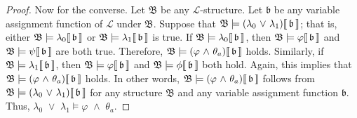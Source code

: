 \begin{proof}
    \vspace{0.3cm}
    \noindent
    Now for the converse.
    Let \( \mathfrak{B} \) be any \( \mathcal{L} \)-structure. Let \( \mathfrak{b} \) be any variable assignment function of \( \mathcal{L} \)
    under \( \mathfrak{B} \).
    Suppose that \( \folwffsatisfaction{\mathfrak{B}}{\mleft( \lambda_{0} \,\,{\lor}\,\, \lambda_{1} \mright)}{\mathfrak{b}} \);
    that is, either \(  \mathfrak{B} \models \lambda_{0}\llbracket\, \mathfrak{b} \,\rrbracket \) or \(  \mathfrak{B} \models \lambda_{1}\llbracket\, \mathfrak{b} \,\rrbracket \) is true.
    If \(  \mathfrak{B} \models \lambda_{0}\llbracket\, \mathfrak{b} \,\rrbracket \), then \(  \mathfrak{B} \models \varphi\llbracket\, \mathfrak{b} \,\rrbracket \)
    and \(  \mathfrak{B} \models \psi\llbracket\, \mathfrak{b} \,\rrbracket \) are both true.
    Therefore, \( \folwffsatisfaction{\mathfrak{B}}{\mleft( \varphi \,\,{\land}\,\, \theta_{a} \mright)}{\mathfrak{b}} \) holds.
    Similarly, if \(  \mathfrak{B} \models \lambda_{1}\llbracket\, \mathfrak{b} \,\rrbracket \),
    then \(  \mathfrak{B} \models \varphi\llbracket\, \mathfrak{b} \,\rrbracket \) and \(  \mathfrak{B} \models \phi\llbracket\, \mathfrak{b} \,\rrbracket \) both hold.
    Again, this implies that \( \folwffsatisfaction{\mathfrak{B}}{\mleft( \varphi \,\,{\land}\,\, \theta_{a} \mright)}{\mathfrak{b}} \) holds.
    In other words, \( \folwffsatisfaction{\mathfrak{B}}{\mleft( \varphi \,\,{\land}\,\, \theta_{a} \mright)}{\mathfrak{b}} \) follows from
    \( \folwffsatisfaction{\mathfrak{B}}{\mleft( \lambda_{0} \,\,{\lor}\,\, \lambda_{1} \mright)}{\mathfrak{b}} \) for any structure
    \( \mathfrak{B} \) and any variable assignment function \( \mathfrak{b} \).
    Thus, \( \lambda_{0} \,\,{\lor}\,\, \lambda_{1} \models \varphi \,\,{\land}\,\, \theta_{a} \).


\end{proof}
